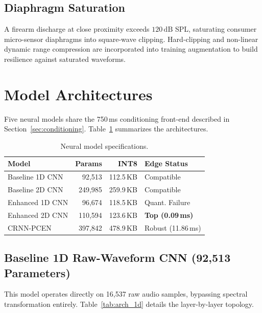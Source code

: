 \documentclass[conference]{IEEEtran}
\begin{document}
\subsection{Diaphragm Saturation}
A firearm discharge at close proximity exceeds $120\,\text{dB}$ SPL, saturating consumer micro-sensor diaphragms into square-wave clipping. Hard-clipping and non-linear dynamic range compression are incorporated into training augmentation to build resilience against saturated waveforms.

\section{Model Architectures}
\label{sec:models}

Five neural models share the 750\,ms conditioning front-end described in Section~\ref{sec:conditioning}. Table~\ref{tab:models} summarizes the architectures.

\begin{table}[!t]
\centering
\caption{Neural model specifications.}
\label{tab:models}
\footnotesize
\begin{tabular}{lrrl}
\toprule
\textbf{Model} & \textbf{Params} & \textbf{INT8} & \textbf{Edge Status} \\
\midrule
Baseline 1D CNN & 92{,}513 & 112.5\,KB & Compatible \\
Baseline 2D CNN & 249{,}985 & 259.9\,KB & Compatible \\
Enhanced 1D CNN & 96{,}674 & 118.5\,KB & Quant. Failure \\
Enhanced 2D CNN & 110{,}594 & 123.6\,KB & \textbf{Top (0.09\,ms)} \\
CRNN-PCEN & 397{,}842 & 478.9\,KB & Robust (11.86\,ms) \\
\bottomrule
\end{tabular}
\end{table}

\subsection{Baseline 1D Raw-Waveform CNN (92{,}513 Parameters)}
This model operates directly on 16{,}537 raw audio samples, bypassing spectral transformation entirely. Table~\ref{tab:arch_1d} details the layer-by-layer topology.
\end{document}
